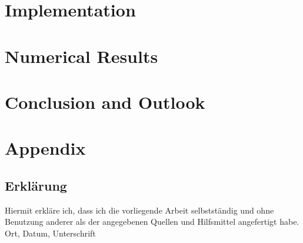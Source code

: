 \documentclass[a4paper, 12pt]{scrreprt} %
\begin{document}
\chapter{Implementation}
\label{chap:Impl}










\chapter{Numerical Results}
\label{chap:NR}



\chapter{Conclusion and Outlook}
\label{chap:CaO}

\clearpage
\appendix
\chapter{Appendix}


\clearpage



\newpage
\section*{Erklärung}		
\thispagestyle{empty}				


Hiermit erkläre ich, dass ich die vorliegende Arbeit selbstständig und ohne Benutzung anderer als der angegebenen Quellen und Hilfsmittel angefertigt habe.
\newline\newline
Ort, Datum, Unterschrift
\end{document}
